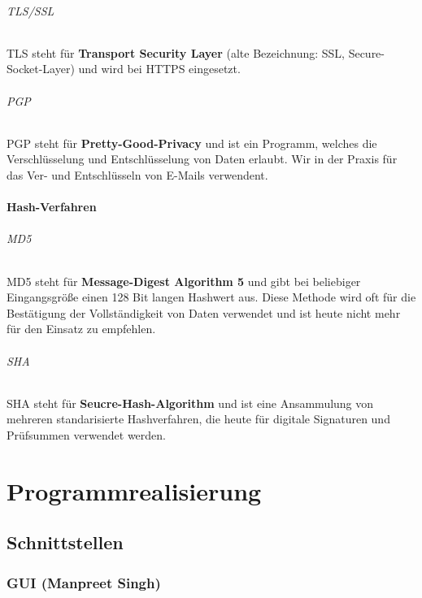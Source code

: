 \documentclass[12pt,a4paper]{report}
\begin{document}
\begin{onehalfspace}
\paragraph{TLS/SSL}

TLS steht für \textbf{Transport Security Layer} (alte Bezeichnung: SSL, Secure-Socket-Layer) und wird bei HTTPS eingesetzt.

\paragraph{PGP}

PGP steht für \textbf{Pretty-Good-Privacy} und ist ein Programm, welches die Verschlüsselung und Entschlüsselung von Daten erlaubt. Wir in der Praxis für das Ver- und Entschlüsseln von E-Mails verwendent.

\subsection{Hash-Verfahren}

\paragraph{MD5}

MD5 steht für \textbf{Message-Digest Algorithm 5} und gibt bei beliebiger Eingangsgröße einen 128 Bit langen Hashwert aus. Diese Methode wird oft für die Bestätigung der Vollständigkeit von Daten verwendet und ist heute nicht mehr für den Einsatz zu empfehlen.

\paragraph{SHA}

SHA steht für \textbf{Seucre-Hash-Algorithm} und ist eine Ansammulung von mehreren standarisierte Hashverfahren, die heute für digitale Signaturen und Prüfsummen verwendet werden.

\part{Programmrealisierung}

\chapter{Schnittstellen}

\section{GUI (Manpreet Singh)}


\end{onehalfspace}
\end{document}
